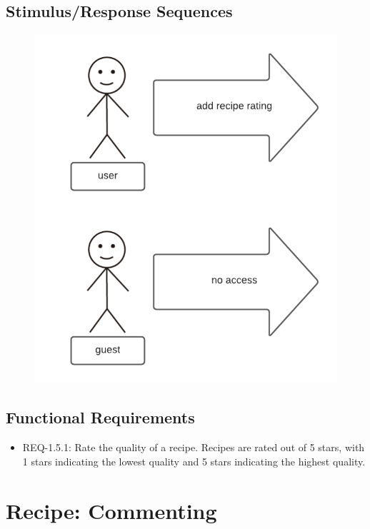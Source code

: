 \documentclass{scrreprt}
\begin{document}
\subsection{Stimulus/Response Sequences}

\begin{figure}[H]\centering
    \includegraphics[width=\columnwidth]{response diagrams/Recipe Rating.png}
\end{figure}

\subsection{\gls{Functional Requirements}}

\begin{itemize}
    \item REQ-1.5.1: Rate the quality of a recipe. Recipes are rated out of 5 stars, with 1 stars indicating the lowest quality and 5 stars indicating the highest quality.
\end{itemize}

\section{Recipe: Commenting}
\end{document}
